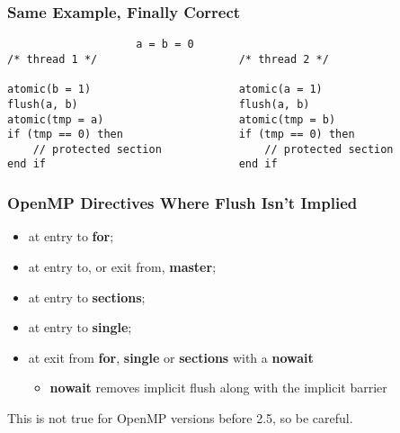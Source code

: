 \begin{frame}[fragile]
  \frametitle{Same Example, Finally Correct}

  \begin{lstlisting}
                    a = b = 0
/* thread 1 */                      /* thread 2 */

atomic(b = 1)                       atomic(a = 1)
flush(a, b)                         flush(a, b)
atomic(tmp = a)                     atomic(tmp = b)
if (tmp == 0) then                  if (tmp == 0) then
    // protected section                // protected section
end if                              end if
  \end{lstlisting}
\end{frame}

\begin{frame}
  \frametitle{OpenMP Directives Where Flush Isn't Implied}

  
  \begin{itemize}
    \item at entry to {\bf for};
    \item at entry to, or exit from, {\bf master};
    \item at entry to {\bf sections}; 
    \item at entry to {\bf single};
    \item at exit from {\bf for}, {\bf single} or {\bf sections} with a {\bf nowait}
      \begin{itemize}
        \item {\bf nowait} removes implicit flush along with the implicit barrier
      \end{itemize}
  \end{itemize}

  This is not true for OpenMP versions before 2.5, so be careful.
  
\end{frame}

